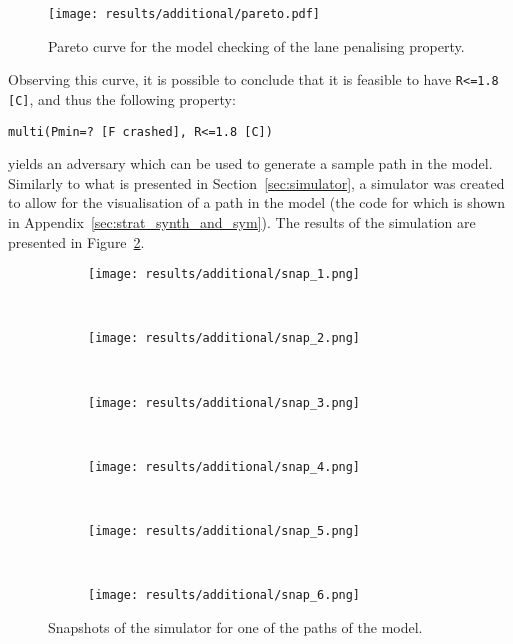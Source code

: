 \begin{figure}[H]
\centering
\texttt{[image: results/additional/pareto.pdf]}
\caption{Pareto curve for the model checking of the lane penalising property.}
\label{fig:lane_penalising_pareto}
\end{figure}

Observing this curve, it is possible to conclude that it is feasible to have \texttt{R<=1.8 [C]}, and thus the following property:

\begin{minipage}{\linewidth}
{\vspace{1em}
\begin{lstlisting}
multi(Pmin=? [F crashed], R<=1.8 [C])
\end{lstlisting}
}
\end{minipage}

yields an adversary which can be used to generate a sample path in the model. Similarly to what is presented in Section~\ref{sec:simulator}, a simulator was created to allow for the visualisation of a path in the model (the code for which is shown in Appendix~\ref{sec:strat_synth_and_sym}). The results of the simulation are presented in Figure~\ref{fig:lane_penalising_sim}.

\begin{figure}[H]
\centering
\begin{subfigure}{0.75\textwidth}
  \centering
  \texttt{[image: results/additional/snap\_1.png]}
\end{subfigure}\\ \vspace{2px}
\begin{subfigure}{0.75\textwidth}
  \centering
  \texttt{[image: results/additional/snap\_2.png]}
\end{subfigure} \\ \vspace{2px}
\begin{subfigure}{0.75\textwidth}
  \centering
  \texttt{[image: results/additional/snap\_3.png]}
\end{subfigure} \\ \vspace{2px}
\begin{subfigure}{0.75\textwidth}
  \centering
  \texttt{[image: results/additional/snap\_4.png]}
\end{subfigure} \\ \vspace{2px}
\begin{subfigure}{0.75\textwidth}
  \centering
  \texttt{[image: results/additional/snap\_5.png]}
\end{subfigure} \\ \vspace{2px}
\begin{subfigure}{0.75\textwidth}
  \centering
  \texttt{[image: results/additional/snap\_6.png]}
\end{subfigure}
\caption{Snapshots of the simulator for one of the paths of the model.}
\label{fig:lane_penalising_sim}
\end{figure}

